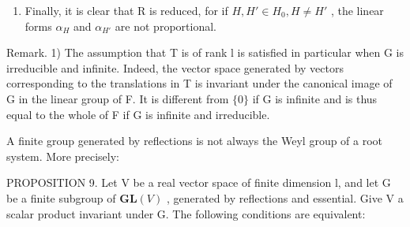 \begin{enumerate}
\def\labelenumi{\alph{enumi})}
\setcounter{enumi}{3}
\tightlist
\item
  Finally, it is clear that R is reduced, for if \(H, H' \in H_{0}, H \neq H'\) , the linear forms \(\alpha_{H}\) and \(\alpha_{H'}\) are not proportional.
\end{enumerate}

Remark. 1) The assumption that T is of rank l is satisfied in particular when G is irreducible and infinite. Indeed, the vector space generated by vectors corresponding to the translations in T is invariant under the canonical image of G in the linear group of F. It is different from \(\{0\}\) if G is infinite and is thus equal to the whole of F if G is infinite and irreducible.

A finite group generated by reflections is not always the Weyl group of a root system. More precisely:

PROPOSITION 9. Let V be a real vector space of finite dimension l, and let G be a finite subgroup of \(\mathbf{GL}(V)\) , generated by reflections and essential. Give V a scalar product invariant under G. The following conditions are equivalent:

